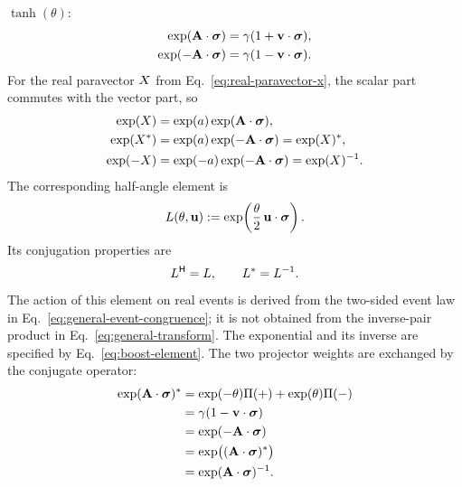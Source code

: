 \(\tanh(\theta)\):
\begin{align*}
\exp(\mathbf{A}\cdot\mathbf{\bm{\sigma}}) &= \gamma(1+\mathbf{v}\cdot\mathbf{\bm{\sigma}}),\notag \\
\exp(-\mathbf{A}\cdot\mathbf{\bm{\sigma}}) &= \gamma(1-\mathbf{v}\cdot\mathbf{\bm{\sigma}}).
\end{align*}
For the real paravector \(X\) from Eq.\ \eqref{eq:real-paravector-x}, the scalar part commutes with the vector part, so
\begin{align*}
\exp(X) &= \exp(a)\exp(\mathbf{A}\cdot\mathbf{\bm{\sigma}}),\notag \\
\exp(X^{*}) &= \exp(a)\exp(-\mathbf{A}\cdot\mathbf{\bm{\sigma}})=\exp(X)^{*},\notag \\
\exp(-X) &= \exp(-a)\exp(-\mathbf{A}\cdot\mathbf{\bm{\sigma}})=\exp(X)^{-1}.
\end{align*}
The corresponding half-angle element is
\begin{equation}
L(\theta,\mathbf{u})
:=\exp\!\left(\frac{\theta}{2}\,\mathbf{u}\cdot\mathbf{\bm{\sigma}}\right).
\label{eq:boost-element}
\end{equation}
Its conjugation properties are
\[
L^{\mathsf H}=L,
\qquad
L^{*}=L^{-1}.
\]
The action of this element on real events is derived from the two-sided
event law in Eq.\ \eqref{eq:general-event-congruence}; it is not obtained
from the inverse-pair product in Eq.\ \eqref{eq:general-transform}. The
exponential and its inverse are specified by Eq.\ \eqref{eq:boost-element}. The two
projector weights are exchanged by the conjugate operator:
\begin{align*}
\exp(\mathbf{A}\cdot\mathbf{\bm{\sigma}})^{*}
&= \exp(-\theta)\Pi(+) + \exp(\theta)\Pi(-)\notag \\
&= \gamma(1-\mathbf{v}\cdot\mathbf{\bm{\sigma}})\notag \\
&= \exp(-\mathbf{A}\cdot\mathbf{\bm{\sigma}})\notag \\
&= \exp\bigl((\mathbf{A}\cdot\mathbf{\bm{\sigma}})^{*}\bigr)\notag \\
&= \exp(\mathbf{A}\cdot\mathbf{\bm{\sigma}})^{-1}.
\end{align*}

